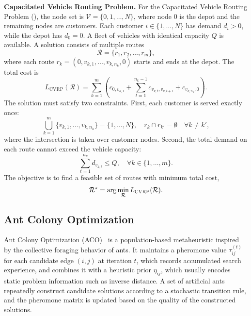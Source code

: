 \noindent\textbf{Capacitated Vehicle Routing Problem.}
For the Capacitated Vehicle Routing Problem (\CVRP{}), the node set is $\mathcal{V}=\{0,1,\ldots,N\}$, where node $0$ is the depot and the remaining nodes are customers. Each customer $i\in\{1,\ldots,N\}$ has demand $d_i>0$, while the depot has $d_0=0$. A fleet of vehicles with identical capacity $Q$ is available. A solution consists of multiple routes
\begin{equation}
\mathcal{R}=\{r_1,r_2,\ldots,r_m\},
\end{equation}
where each route $r_k=(0,v_{k,1},\ldots,v_{k,n_k},0)$ starts and ends at the depot. The total cost is
\begin{equation} L_{\mathrm{CVRP}}(\mathcal{R}) = \sum_{k=1}^{m} \left( c_{0,v_{k,1}} + \sum_{t=1}^{n_k-1} c_{v_{k,t},v_{k,t+1}} + c_{v_{k,n_k},0} \right). \end{equation}
The solution must satisfy two constraints. First, each customer is served exactly once:
\begin{equation}
\bigcup_{k=1}^{m}\{v_{k,1},\ldots,v_{k,n_k}\}
=
\{1,\ldots,N\},
\quad
r_k \cap r_{k'} = \emptyset
\quad \forall k\neq k',
\end{equation}
where the intersection is taken over customer nodes. Second, the total demand on each route cannot exceed the vehicle capacity:
\begin{equation}
\sum_{t=1}^{n_k} d_{v_{k,t}} \leq Q,
\quad
\forall k\in\{1,\ldots,m\}.
\end{equation}
The objective is to find a feasible set of routes with minimum total cost,
\begin{equation}
\mathcal{R}^{\star}
=
\arg\min_{\mathcal{R}} L_{\textsc{CVRP}{}}(\mathcal{R}).
\end{equation}

\subsection{Ant Colony Optimization}
\label{subsec:prelim_aco}

Ant Colony Optimization (ACO)~\cite{ACO,maxmin} is a population-based metaheuristic inspired by the collective foraging behavior of ants. It maintains a pheromone value $\tau_{ij}^{(t)}$ for each candidate edge $(i,j)$ at iteration $t$, which records accumulated search experience, and combines it with a heuristic prior $\eta_{ij}$, which usually encodes static problem information such as inverse distance. A set of artificial ants repeatedly construct candidate solutions according to a stochastic transition rule, and the pheromone matrix is updated based on the quality of the constructed solutions.

